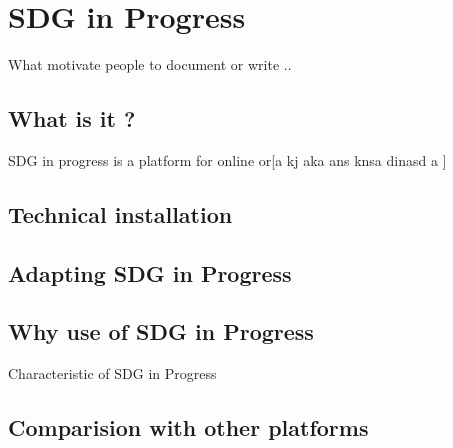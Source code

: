 \chapter{SDG in Progress}
What motivate people to document or write ..

\section{What is it ?}

SDG in progress is a platform for online or[a kj   aka ans knsa dinasd a
 ]
\section{Technical installation}

\section{Adapting SDG in Progress}

\section{Why use of SDG in Progress}
Characteristic of SDG in Progress
\section{Comparision with other platforms}

